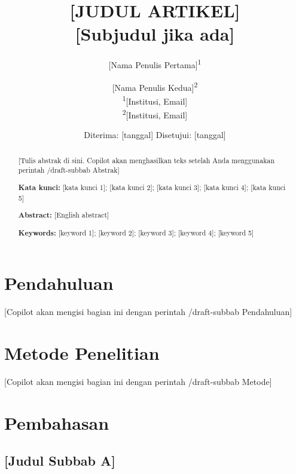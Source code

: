 \documentclass[12pt,a4paper]{article}
\title{%
  \textbf{[JUDUL ARTIKEL]}\\[0.5em]
  \large [Subjudul jika ada]
}
\author{%
  [Nama Penulis Pertama]\textsuperscript{1} \and
  [Nama Penulis Kedua]\textsuperscript{2}\\[0.5em]
  \small\textsuperscript{1}[Institusi, Email]\\
  \small\textsuperscript{2}[Institusi, Email]
}
\date{Diterima: [tanggal] \quad Disetujui: [tanggal]}
\begin{document}
\maketitle

\begin{abstract}
\noindent
[Tulis abstrak di sini. Copilot akan menghasilkan teks setelah Anda menggunakan perintah /draft-subbab Abstrak]

\medskip
\noindent\textbf{Kata kunci:} [kata kunci 1]; [kata kunci 2]; [kata kunci 3]; [kata kunci 4]; [kata kunci 5]

\medskip
\noindent\textbf{Abstract:} [English abstract]

\noindent\textbf{Keywords:} [keyword 1]; [keyword 2]; [keyword 3]; [keyword 4]; [keyword 5]
\end{abstract}

\section{Pendahuluan}

[Copilot akan mengisi bagian ini dengan perintah /draft-subbab Pendahuluan]

\section{Metode Penelitian}

[Copilot akan mengisi bagian ini dengan perintah /draft-subbab Metode]

\section{Pembahasan}

\subsection{[Judul Subbab A]}
\end{document}
